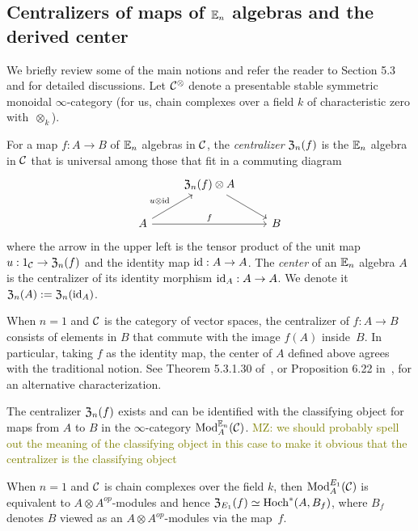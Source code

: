 \documentclass[11pt]{amsart}
\numberwithin{equation}{section}
\def\mahmoud{\textcolor{olive}{MZ: }\textcolor{olive}}
\begin{document}
\subsection{Centralizers of maps of $\mathbb E_n$ algebras and the derived center}
\label{sec: centralizer}

We briefly review some of the main notions and refer the reader to \cite{LurieHA} Section 5.3 and \cite{FrancisHH} for detailed discussions. Let $\mathcal C^\otimes$ denote a presentable stable symmetric monoidal $\infty$-category (for us, chain complexes over a field $k$ of characteristic zero with~$\otimes_k$).

\begin{dfn}\label{D:centralizer}
For a map $f: A \to B$ of $\mathbb E_n$ algebras in $\mathcal C$, 
the {\em centralizer} ${\frak Z}_n(f)$ is the $\mathbb E_n$ algebra in $\mathcal C$ that is universal among those that fit in a commuting diagram
\[
\begin{tikzcd}
& {\frak Z}_n(f) \otimes A \arrow[dr] & \\
A \arrow[ur, "u \otimes \id"] \arrow[rr, "f"] && B
\end{tikzcd}
\]
where the arrow in the upper left is the tensor product of the unit map $u: 1_\mathcal C \to {\frak Z}_n(f)$ and the identity map ${\rm id}: A \to A$.
The {\em center} of an $\mathbb E_n$ algebra $A$ is the centralizer of its identity morphism ${\rm id}_A: A \to A$. 
We  denote it ${\frak Z}_n(A) := {\frak Z}_n({\rm id}_A)$.
\end{dfn}

When $n=1$ and $\mathcal C$ is the category of vector spaces, 
the centralizer of $f: A \to B$ consists of elements in $B$ that commute with the image $f(A)$ inside~$B$. 
In particular, taking $f$ as the identity map, 
the center of $A$ defined above agrees with the traditional notion. 
See Theorem 5.3.1.30 of~\cite{LurieHA}, or Proposition 6.22 in~\cite{GTZ3}, for an alternative characterization.

\begin{prp}
\label{T:centralizer=inthom} 
The centralizer ${\frak Z}_n(f)$ exists and can be identified with the classifying object for maps from $A$ to $B$ in the $\infty$-category ${\rm Mod}^{\mathbb E_n}_A(\mathcal C)$. \mahmoud{we should probably spell out the meaning of the classifying object in this case to make it obvious that the centralizer is the classifying object}
\end{prp} 

When $n=1$ and $\mathcal C$ is chain complexes over the field $k$, then ${\rm Mod}^{E_1}_A(\mathcal C)$ is equivalent to $A\otimes A^{op}$-modules and hence ${\frak Z}_{E_1}(f) \simeq {\rm Hoch}^*(A,B_f)$,
where $B_f$ denotes $B$ viewed as an $A\otimes A^{op}$-modules via the map~$f$.
\end{document}
